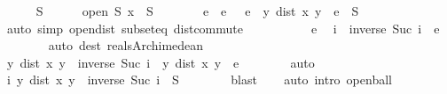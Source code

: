 \begin{isabellebody}
\ \ \ \ \isamarkupfalse%
\ S\isanewline
\ \ \ \ \isamarkupfalse%
\ {\isachardoublequoteopen}open\ S{\isachardoublequoteclose}\ {\isachardoublequoteopen}x\ {\isasymin}\ S{\isachardoublequoteclose}\isanewline
\ \ \ \ \isamarkupfalse%
\ \isamarkupfalse%
\ e\ \ e{\isacharcolon}{\kern0pt}\ {\isachardoublequoteopen}{}\ {\isacharless}{\kern0pt}\ e{\isachardoublequoteclose}\ \ {\isachardoublequoteopen}{\isacharbraceleft}{\kern0pt}y{\isachardot}{\kern0pt}\ dist\ x\ y\ {\isacharless}{\kern0pt}\ e{\isacharbraceright}{\kern0pt}\ {\isasymsubseteq}\ S{\isachardoublequoteclose}\isanewline
\ \ \ \ \ \ \isamarkupfalse%
\ {\isacharparenleft}{\kern0pt}auto\ simp{\isacharcolon}{\kern0pt}\ open{\isacharunderscore}{\kern0pt}dist\ subset{\isacharunderscore}{\kern0pt}eq\ dist{\isacharunderscore}{\kern0pt}commute{\isacharparenright}{\kern0pt}\isanewline
\ \ \ \ \isamarkupfalse%
\isanewline
\ \ \ \ \isamarkupfalse%
\ e\ \isamarkupfalse%
\ i\ \ {\isachardoublequoteopen}inverse\ {\isacharparenleft}{\kern0pt}Suc\ i{\isacharparenright}{\kern0pt}\ {\isacharless}{\kern0pt}\ e{\isachardoublequoteclose}\isanewline
\ \ \ \ \ \ \isamarkupfalse%
\ {\isacharparenleft}{\kern0pt}auto\ dest{\isacharbang}{\kern0pt}{\isacharcolon}{\kern0pt}\ reals{\isacharunderscore}{\kern0pt}Archimedean{\isacharparenright}{\kern0pt}\isanewline
\ \ \ \ \isamarkupfalse%
\ \isamarkupfalse%
\ {\isachardoublequoteopen}{\isacharbraceleft}{\kern0pt}y{\isachardot}{\kern0pt}\ dist\ x\ y\ {\isacharless}{\kern0pt}\ inverse\ {\isacharparenleft}{\kern0pt}Suc\ i{\isacharparenright}{\kern0pt}{\isacharbraceright}{\kern0pt}\ {\isasymsubseteq}\ {\isacharbraceleft}{\kern0pt}y{\isachardot}{\kern0pt}\ dist\ x\ y\ {\isacharless}{\kern0pt}\ e{\isacharbraceright}{\kern0pt}{\isachardoublequoteclose}\isanewline
\ \ \ \ \ \ \isamarkupfalse%
\ auto\isanewline
\ \ \ \ \isamarkupfalse%
\ \isamarkupfalse%
\ {\isachardoublequoteopen}{\isasymexists}i{\isachardot}{\kern0pt}\ {\isacharbraceleft}{\kern0pt}y{\isachardot}{\kern0pt}\ dist\ x\ y\ {\isacharless}{\kern0pt}\ inverse\ {\isacharparenleft}{\kern0pt}Suc\ i{\isacharparenright}{\kern0pt}{\isacharbraceright}{\kern0pt}\ {\isasymsubseteq}\ S{\isachardoublequoteclose}\isanewline
\ \ \ \ \ \ \isamarkupfalse%
\ blast\isanewline
\ \ \isamarkupfalse%
\ {\isacharparenleft}{\kern0pt}auto\ intro{\isacharcolon}{\kern0pt}\ open{\isacharunderscore}{\kern0pt}ball{\isacharparenright}{\kern0pt}\isanewline

\end{isabellebody}
